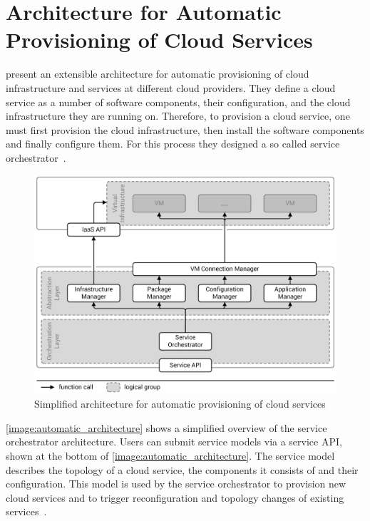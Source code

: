 \section{Architecture for Automatic Provisioning of Cloud Services}
\label{related:architecture}

\citeauthor*{provisioning:architecture} present an extensible architecture for automatic provisioning of cloud infrastructure and services at different cloud providers.
They define a cloud service as a number of software components, their configuration, and the cloud infrastructure they are running on.
Therefore, to provision a cloud service, one must first provision the cloud infrastructure, then install the software components and finally configure them.
For this process they designed a so called service orchestrator~\autocite{provisioning:architecture}.

\begin{figure}[!htbp]
	\centering
	\includegraphics[resolution=600]{related/assets/automatic_architecture}
	\caption{Simplified architecture for automatic provisioning of cloud services~\autocite[based on][]{provisioning:architecture}}
	\label{image:automatic_architecture}
\end{figure}

\autoref{image:automatic_architecture} shows a simplified overview of the service orchestrator architecture.
Users can submit service models via a service API, shown at the bottom of \autoref{image:automatic_architecture}.
The service model describes the topology of a cloud service, the components it consists of and their configuration.
This model is used by the service orchestrator to provision new cloud services and to trigger reconfiguration and topology changes of existing services~\autocite{provisioning:architecture}.

